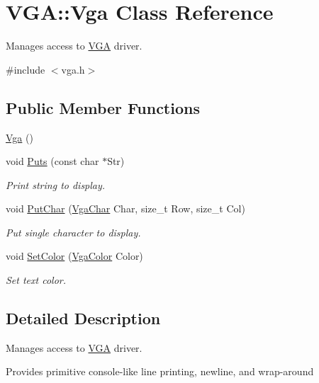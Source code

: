 \hypertarget{class_v_g_a_1_1_vga}{}\section{V\+GA\+:\+:Vga Class Reference}
\label{class_v_g_a_1_1_vga}


Manages access to \hyperlink{namespace_v_g_a}{V\+GA} driver.  




{\ttfamily \#include $<$vga.\+h$>$}

\subsection*{Public Member Functions}
\begin{DoxyCompactItemize}
\item 
\hyperlink{class_v_g_a_1_1_vga_a40f0b5de5a1687eca3c47738d8232bc7}{Vga} ()
\item 
void \hyperlink{class_v_g_a_1_1_vga_ad9977be41b05972a0366f8448b669a71}{Puts} (const char $\ast$Str)
\begin{DoxyCompactList}\small\item\em Print string to display. \end{DoxyCompactList}\item 
void \hyperlink{class_v_g_a_1_1_vga_a29fa008c7c3c71535e0502063451bea7}{Put\+Char} (\hyperlink{namespace_v_g_a_adb876ce4a116e09f39708ca16ef25f74}{Vga\+Char} Char, size\+\_\+t Row, size\+\_\+t Col)
\begin{DoxyCompactList}\small\item\em Put single character to display. \end{DoxyCompactList}\item 
void \hyperlink{class_v_g_a_1_1_vga_af865dcb8b0e73497fa242601619f5570}{Set\+Color} (\hyperlink{namespace_v_g_a_afa3882cddefd08a3f33aaf6fcbcbcd7f}{Vga\+Color} Color)
\begin{DoxyCompactList}\small\item\em Set text color. \end{DoxyCompactList}\end{DoxyCompactItemize}


\subsection{Detailed Description}
Manages access to \hyperlink{namespace_v_g_a}{V\+GA} driver. 

Provides primitive console-\/like line printing, newline, and wrap-\/around 

